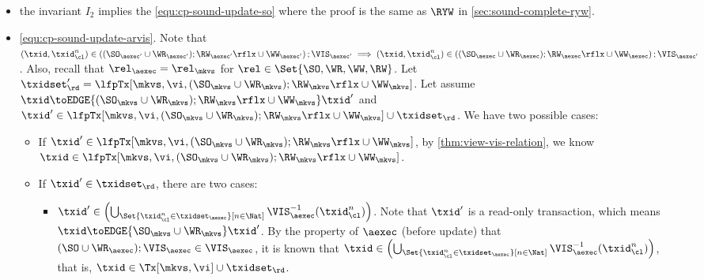 \begin{itemize}
\item the invariant \( I_2 \) implies the \cref{equ:cp-sound-update-so} where the proof is the same as \( \RYW \) in \cref{sec:sound-complete-ryw}.

\item \cref{equ:cp-sound-update-arvis}.
    Note that \( (\txid, \txid_\cl^n) \in \left( (\SO_{\aexec'} \cup \WR_{\aexec'} ) ; \RW_{\aexec'}\rflx \cup \WW_{\aexec'} \right) ; \VIS_{\aexec'} \implies (\txid, \txid_\cl^n) \in \left( (\SO_{\aexec} \cup \WR_{\aexec} ) ; \RW_{\aexec}\rflx \cup \WW_{\aexec} \right) ; \VIS_{\aexec'}\).
    Also, recall that \( \rel_\aexec = \rel_\mkvs \) for \( \rel \in \Set{\SO, \WR, \WW, \RW} \).
    Let \( \txidset'_\rd = \lfpTx[\mkvs,\vi,(\SO_{\mkvs} \cup \WR_{\mkvs} ) ; \RW_{\mkvs}\rflx \cup \WW_{\mkvs} ] \). 
    Let assume \( \txid \toEDGE{(\SO_{\mkvs} \cup \WR_{\mkvs} ) ; \RW_{\mkvs}\rflx \cup \WW_{\mkvs}} \txid' \) and \( \txid' \in \lfpTx[\mkvs, \vi, (\SO_{\mkvs} \cup \WR_{\mkvs} ) ; \RW_{\mkvs}\rflx \cup \WW_{\mkvs}] \cup \txidset_\rd \).
    We have two possible cases:
    \begin{itemize}
        \item If \( \txid' \in \lfpTx[\mkvs, \vi, (\SO_{\mkvs} \cup \WR_{\mkvs} ) ; \RW_{\mkvs}\rflx \cup \WW_{\mkvs}] \), by  \cref{thm:view-vis-relation}, we know \( \txid \in \lfpTx[\mkvs, \vi, (\SO_{\mkvs} \cup \WR_{\mkvs} ) ; \RW_{\mkvs}\rflx \cup \WW_{\mkvs}] \).
        \item If \( \txid' \in \txidset_\rd \), there are two cases:
        \begin{itemize}
            \item \( \txid' \in  \left( \bigcup_{\Set{\txid_{\cl}^{n} \in \txidset_{\aexec} }[ n \in \Nat ]} \VIS_{\aexec}^{-1}(\txid^n_\cl) \right) \).
                Note that \( \txid' \) is a read-only transaction,
                which means \( \txid \toEDGE{\SO_{\mkvs} \cup \WR_{\mkvs} } \txid' \).
                By the property of \( \aexec \) (before update) that \( ( \SO \cup \WR_\aexec ) ; \VIS_\aexec  \in \VIS_\aexec \), it is known that \( \txid \in \left( \bigcup_{\Set{\txid_{\cl}^{n} \in \txidset_{\aexec} }[ n \in \Nat ]} \VIS_{\aexec}^{-1}(\txid^n_\cl) \right) \), that is, \( \txid \in \Tx[\mkvs,\vi] \cup \txidset_\rd\).


\end{itemize}
\end{itemize}
\end{itemize}
